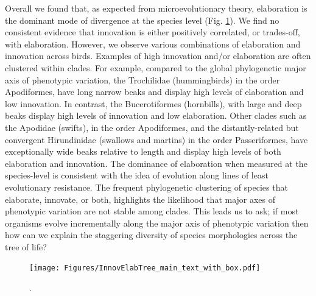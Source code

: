 \documentclass[12pt,letterpaper]{article}
\begin{document}
Overall we found that, as expected from microevolutionary theory, elaboration is the dominant mode of divergence at the species level (Fig. \ref{Fig:phylogeny}).
We find no consistent evidence that innovation is either positively correlated, or trades-off, with elaboration. %
However, we observe various combinations of elaboration and innovation across birds.
Examples of high innovation and/or elaboration are often clustered within clades.
For example, compared to the global phylogenetic major axis of phenotypic variation, the Trochilidae (hummingbirds) in the order Apodiformes, have long narrow beaks and display high levels of elaboration and low innovation.
In contrast, the Bucerotiformes (hornbills), with large and deep beaks display high levels of innovation and low elaboration.
Other clades such as the Apodidae (swifts), in the order Apodiformes, and the distantly-related but convergent Hirundinidae (swallows and martins) in the order Passeriformes, have exceptionally wide beaks relative to length and display high levels of both elaboration and innovation.
The dominance of elaboration when measured at the species-level is consistent with the idea of evolution along lines of least evolutionary resistance.
The frequent phylogenetic clustering of species that elaborate, innovate, or both, highlights the likelihood that major axes of phenotypic variation are not stable among clades.
This leads us to ask; if most organisms evolve incrementally along the major axis of phenotypic variation then how can we explain the staggering diversity of species morphologies across the tree of life? 

\begin{figure}[!htbp]
\centering
    \texttt{[image: Figures/InnovElabTree\_main\_text\_with\_box.pdf]}
\caption{.}
\label{Fig:phylogeny}
\end{figure}


\bigskip
\end{document}
